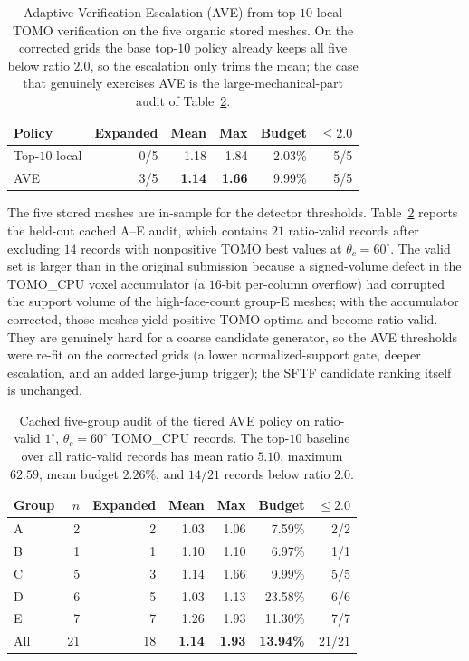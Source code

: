 \documentclass[11pt,a4paper]{article}
\begin{document}
\begin{table}[H]
\centering
\caption{Adaptive Verification Escalation (AVE) from top-$10$ local TOMO verification on the five organic stored meshes.
On the corrected grids the base top-$10$ policy already keeps all five below ratio $2.0$, so the escalation only trims the mean; the case that genuinely exercises AVE is the large-mechanical-part audit of Table~\ref{tab:ave-g5}.}
\label{tab:ave}
\small
\begin{tabular}{lrrrrr}
\toprule
Policy & Expanded & Mean & Max & Budget & $\le 2.0$\\
\midrule
Top-$10$ local & 0/5 & 1.18 & 1.84 & 2.03\% & 5/5\\
AVE & 3/5 & \textbf{1.14} & \textbf{1.66} & 9.99\% & 5/5\\
\bottomrule
\end{tabular}
\end{table}

The five stored meshes are in-sample for the detector thresholds. Table~\ref{tab:ave-g5} reports the held-out cached A--E audit, which contains $21$ ratio-valid records after excluding $14$ records with nonpositive TOMO best values at $\theta_c=60^\circ$. The valid set is larger than in the original submission because a signed-volume defect in the TOMO\_CPU voxel accumulator (a $16$-bit per-column overflow) had corrupted the support volume of the high-face-count group-E meshes; with the accumulator corrected, those meshes yield positive TOMO optima and become ratio-valid. They are genuinely hard for a coarse candidate generator, so the AVE thresholds were re-fit on the corrected grids (a lower normalized-support gate, deeper escalation, and an added large-jump trigger); the SFTF candidate ranking itself is unchanged.

\begin{table}[H]
\centering
\caption{Cached five-group audit of the tiered AVE policy on ratio-valid $1^\circ$, $\theta_c=60^\circ$ TOMO\_CPU records.
The top-$10$ baseline over all ratio-valid records has mean ratio $5.10$, maximum $62.59$, mean budget $2.26\%$, and $14/21$ records below ratio $2.0$.}
\label{tab:ave-g5}
\small
\begin{tabular}{lrrrrrr}
\toprule
Group & $n$ & Expanded & Mean & Max & Budget & $\le 2.0$\\
\midrule
A & 2 & 2 & 1.03 & 1.06 & 7.59\% & 2/2\\
B & 1 & 1 & 1.10 & 1.10 & 6.97\% & 1/1\\
C & 5 & 3 & 1.14 & 1.66 & 9.99\% & 5/5\\
D & 6 & 5 & 1.03 & 1.13 & 23.58\% & 6/6\\
E & 7 & 7 & 1.26 & 1.93 & 11.30\% & 7/7\\
\midrule
All & 21 & 18 & \textbf{1.14} & \textbf{1.93} & \textbf{13.94\%} & 21/21\\
\bottomrule
\end{tabular}
\end{table}
\end{document}
